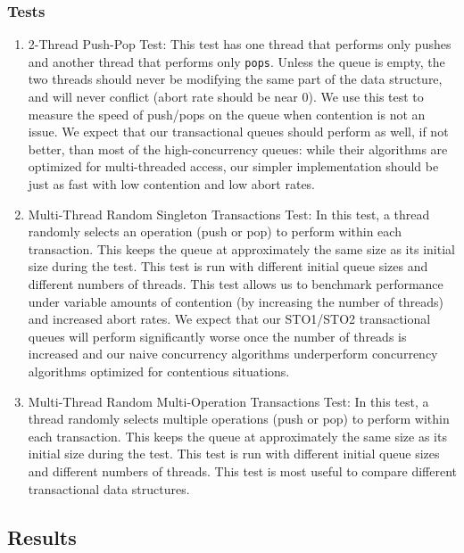 \subsubsection{Tests}
\begin{enumerate}
\item 2-Thread Push-Pop Test: This test has one thread that performs only pushes and another thread that performs only \texttt{pops}. Unless the queue is empty, the two threads should never be modifying the same part of the data structure, and will never conflict (abort rate should be near 0). We use this test to measure the speed of push/pops on the queue when contention is not an issue. We expect that our transactional queues should perform as well, if not better, than most of the high-concurrency queues: while their algorithms are optimized for multi-threaded access, our simpler implementation should be just as fast with low contention and low abort rates.

\item Multi-Thread Random Singleton Transactions Test: 
    In this test, a thread randomly selects an operation (push or pop) to perform within each transaction. This keeps the queue at approximately the same size as its initial size during the test. This test is run with different initial queue sizes and different numbers of threads. This test allows us to benchmark performance under variable amounts of contention (by increasing the number of threads) and increased abort rates. We expect that our STO1/STO2 transactional queues will perform significantly worse once the number of threads is increased and our naive concurrency algorithms underperform concurrency algorithms optimized for contentious situations.
    
\item Multi-Thread Random Multi-Operation Transactions Test: 
    In this test, a thread randomly selects multiple operations (push or pop) to perform within each transaction. This keeps the queue at approximately the same size as its initial size during the test. This test is run with different initial queue sizes and different numbers of threads. This test is most useful to compare different transactional data structures.
    
\end{enumerate}

\subsection{Results}

